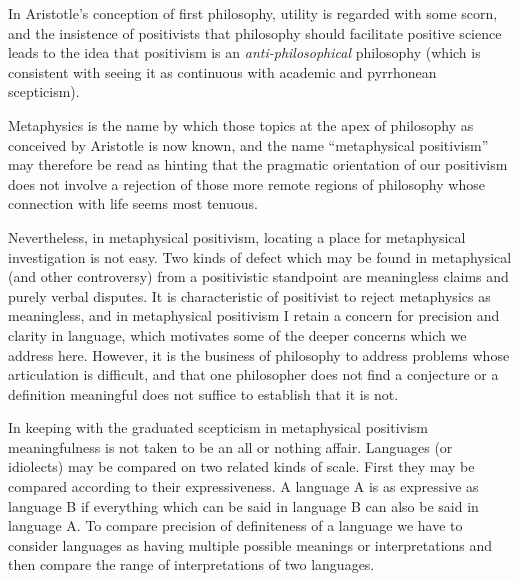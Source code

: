 In Aristotle's conception of first philosophy, utility is regarded with
some scorn, and the insistence of positivists that philosophy should
facilitate positive science leads to the idea that positivism is an
\emph{anti-philosophical} philosophy (which is consistent with seeing
it as continuous with academic and pyrrhonean scepticism).

Metaphysics is the name by which those topics at the apex of
philosophy as conceived by Aristotle is now known, and the name
``metaphysical positivism'' may therefore be read as hinting that the
pragmatic orientation of our positivism does not involve a rejection
of those more remote regions of philosophy whose connection with life
seems most tenuous.

Nevertheless, in metaphysical positivism, locating a place for
metaphysical investigation is not easy.
Two kinds of defect which may be found in metaphysical (and other
controversy) from a positivistic standpoint are meaningless claims and
purely verbal disputes.
It is characteristic of positivist to reject metaphysics as
meaningless, and in metaphysical positivism I retain a concern for
precision and clarity in language, which motivates some of the deeper
concerns which we address here.
However, it is the business of philosophy to address problems whose
articulation is difficult, and that one philosopher does not find a
conjecture or a definition meaningful does not suffice to establish
that it is not.

In keeping with the graduated scepticism in metaphysical positivism
meaningfulness is not taken to be an all or nothing affair.
Languages (or idiolects) may be compared on two related kinds of scale.
First they may be compared according to their expressiveness.
A language A is as expressive as language B if everything which can be
said in language B can also be said in language A.
To compare precision of definiteness of a language we have to consider
languages as having multiple possible meanings or interpretations and
then compare the range of interpretations of two languages.

